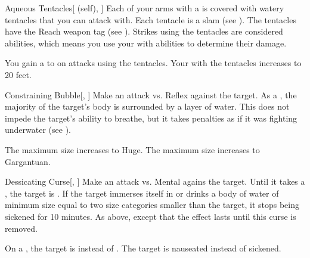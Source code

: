 \lowercase{\hypertarget{spell:Aqueous Tentacles}{}}\label{spell:Aqueous Tentacles}
\begin{attuneability}[Rank 3]{\hypertarget{spell:Aqueous Tentacles}{Aqueous Tentacles}}[ (self), ]
Each of your arms with a  is covered with watery tentacles that you can attack with.
Each tentacle is a slam  (see ).
The tentacles have the Reach weapon tag (see ).
Strikes using the tentacles are considered  abilities, which means you use your  with  abilities to determine their damage.

\rankline
{} You gain a   to  on attacks using the tentacles.
 Your  with the tentacles increases to 20 feet.
\end{attuneability}
\vspace{0.25em}



\lowercase{\hypertarget{spell:Constraining Bubble}{}}\label{spell:Constraining Bubble}
\begin{freeability}[Rank 3]{\hypertarget{spell:Constraining Bubble}{Constraining Bubble}}[, ]
Make an attack vs. Reflex against the target.
\hit As a , the majority of the target's body is surrounded by a layer of water.
This does not impede the target's ability to breathe, but it takes penalties as if it was fighting underwater (see ).

\rankline
{} The maximum size increases to Huge.
 The maximum size increases to Gargantuan.
\end{freeability}
\vspace{0.25em}



\lowercase{\hypertarget{spell:Dessicating Curse}{}}\label{spell:Dessicating Curse}
\begin{freeability}[Rank 3]{\hypertarget{spell:Dessicating Curse}{Dessicating Curse}}[, ]
Make an attack vs. Mental agains the target.
\hit Until it takes a , the target is .
If the target immerses itself in or drinks a body of water of minimum size equal to two size categories smaller than the target,
it stops being sickened for 10 minutes.
\crit As above, except that the effect lasts until this curse is removed.

\rankline
{} On a , the target is  instead of .
 The target is nauseated instead of sickened.
\end{freeability}
\vspace{0.25em}




